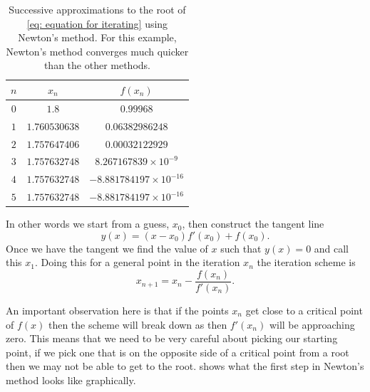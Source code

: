 \begin{table}[ht]
\centering
\caption{Successive approximations to the root of \cref{eq: equation for iterating} using Newton's method. For this example, Newton's method converges much quicker than the other methods.}

\vspace{2mm}

\label{table:3}



\begin{tabular}{|c|c|c|} 
 \hline
$n$& $x_{n}$ &$f(x_{n})$\\
 \hline
 $0$ & $1.8$ & $0.99968$ \\
 \hline
$1$ &$1.760530638$ & $0.06382986248$ \\
\hline
$2$ &$1.757647406$ & $0.00032122929$	\\
\hline
$3$ & $1.757632748$& $8.267167839\times10^{-9}$\\
\hline
$4$ & $1.757632748$& $-8.881784197\times10^{-16}$\\
\hline
$5$ & $1.757632748$ & $-8.881784197\times10^{-16}$\\
\hline
\end{tabular}
\end{table}

In other words we start from a guess, $x_{0}$, then construct the tangent line
\begin{equation*}
y(x)=\left(x-x_{0}\right)f'(x_{0})+f(x_{0}).
\end{equation*} 
Once we have the tangent we find the value of $x$ such that $y(x)=0$ and call this $x_{1}$. Doing this for a general point in the iteration $x_{n}$ the iteration scheme is
\begin{equation}
x_{n+1}=x_{n}-\frac{f(x_{n})}{f'(x_{n})}.
\label{eq: Newton iteration scheme}
\end{equation}

An important observation here is that if the points $x_{n}$ get close to a critical point of $f(x)$ then the scheme will break down as then $f'(x_{n})$ will be approaching zero. This means that we need to be very careful about picking our starting point, if we pick one that is on the opposite side of a critical point from a root then we may not be able to get to the root.  shows what the first step in Newton's method looks like graphically.\\

